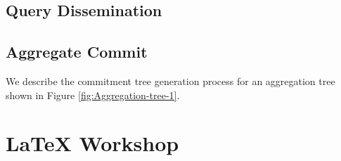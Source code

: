 \documentclass[%
  slidesonly,%
  semlayer%
  ]{seminar}                                  %
\begin{document}
\begin{slide}
    \subsection*{Query Dissemination}
      \clearpage

    \subsection*{Aggregate Commit}
      We describe the commitment tree generation process for an aggregation tree shown in Figure \ref{fig:Aggregation-tree-1}.

      \clearpage

\clearpage

\section*{\LaTeX{ } Workshop}

\vspace{.75in}

\end{slide}
\end{document}

